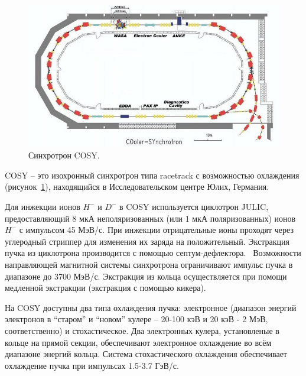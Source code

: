 
\begin{figure}[h]
	\centering
	\includegraphics[scale=.5]{images/chapter4/800px-COSY_Ring}
	\caption{Синхротрон COSY.\label{fig:COSY_Ring}}
\end{figure}

COSY -- это изохронный синхротрон типа racetrack с возможностью охлаждения (рисунок~\ref{fig:COSY_Ring}), находящийся в Исследовательском центре Юлих, Германия.~\cite{COSY-Ring}

Для инжекции ионов $H^-$ и $D^-$ в COSY  используется циклотрон JULIC, предоставляющий 8 мкА неполяризованных (или 1 мкА поляризованных) ионов $H^-$ с импульсом 45 МэВ/с. При инжекции отрицательные ионы проходят через углеродный стриппер для изменения их заряда на положительный. Экстракция пучка из циклотрона производится с помощью септум-дефлектора.~\cite{JULIC-Injector}
%
Возможности направляющей магнитной системы синхротрона ограничивают импульс пучка в диапазоне до 3700 МэВ/с. Экстракция из кольца осуществляется при помощи медленной экстракции (экстракция с помощью кикера).

На COSY доступны два типа охлаждения пучка: электронное (диапазон энергий электронов в ``старом'' и ``новом'' кулере -- 20-100 кэВ и 20 кэВ - 2 МэВ, соответственно) и стохастическое. 
%
Два электронных кулера, установленые в кольце на прямой секции, обеспечивают электронное охлаждение во всём диапазоне энергий кольца. Система стохастического охлаждения обеспечивает охлаждение пучка при импульсах 1.5-3.7 ГэВ/с.